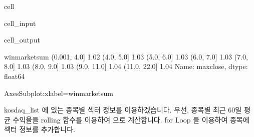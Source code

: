 \documentclass[letterpaper,10pt,english]{jupyterBook}
\begin{document}
\begin{sphinxuseclass}{cell}\begin{sphinxVerbatimInput}

\begin{sphinxuseclass}{cell_input}
\begin{sphinxVerbatim}[commandchars=\\\{\}]
      
  \PYG{p}{[}\PYG{p}{]} 
\PYG{p}{[}\PYG{p}{]}
\PYG{p}{[}\PYG{p}{]}
\end{sphinxVerbatim}

\end{sphinxuseclass}\end{sphinxVerbatimInput}
\begin{sphinxVerbatimOutput}

\begin{sphinxuseclass}{cell_output}
\begin{sphinxVerbatim}[commandchars=\\\{\}]
win\PYGZus{}market\PYGZus{}sum
(\PYGZhy{}0.001, 4.0]   1.02
(4.0, 5.0]      1.03
(5.0, 6.0]      1.03
(6.0, 7.0]      1.03
(7.0, 8.0]      1.03
(8.0, 9.0]      1.03
(9.0, 11.0]     1.04
(11.0, 22.0]    1.04
Name: max\PYGZus{}close, dtype: float64
\end{sphinxVerbatim}

\begin{sphinxVerbatim}[commandchars=\\\{\}]
\PYGZlt{}AxesSubplot:xlabel=\PYGZsq{}win\PYGZus{}market\PYGZus{}sum\PYGZsq{}\PYGZgt{}
\end{sphinxVerbatim}

\noindent{}

\end{sphinxuseclass}\end{sphinxVerbatimOutput}

\end{sphinxuseclass}
\sphinxAtStartPar
 kosdaq\_list 에 있는 종목별 섹터 정보를 이용하겠습니다. 우선, 종목별 최근 60일 평균 수익율을 rolling 함수를 이용하여 으로 계산합니다. for Loop 을 이용하여 종목에 섹터 정보를 추가합니다.
\end{document}
